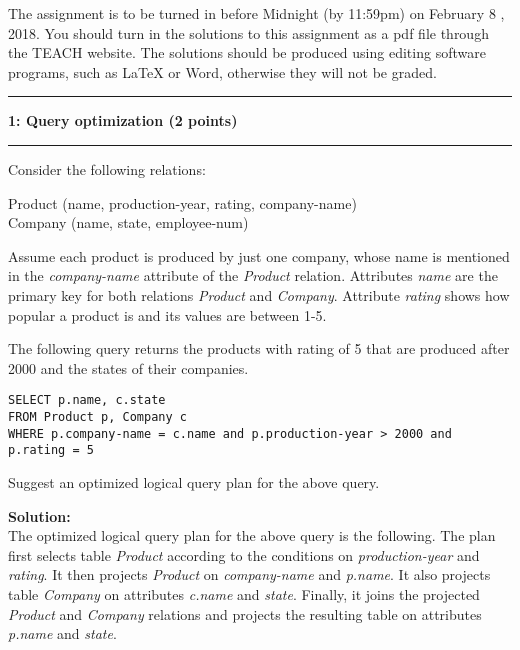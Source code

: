 \documentclass[11pt]{article}
\newcommand\question[2]{\vspace{.25in}\hrule\textbf{#1: #2}\vspace{.5em}\hrule\vspace{.10in}}
\begin{document}
\raggedright
\newcommand\NAME{Nicholas Jake Jeffreys}  %
\newcommand\ANDREWID{932-221-702}     %
\newcommand\HWNUM{4}              %


The assignment is to be turned in before Midnight (by 11:59pm) on February 8 , 2018.
You should turn in the solutions to this assignment as a pdf file through the TEACH website.
The solutions should be produced using editing software programs, such as LaTeX or Word, otherwise they will not be graded.


\question{1}{Query optimization  (2 points)}
Consider the following relations:


Product (name, production-year, rating, company-name)\\
Company (name, state, employee-num)

Assume each product is produced by just one company, whose name is mentioned in the
{\it company-name} attribute of the {\it Product} relation.
Attributes {\it name} are the primary key for both relations {\it Product} and {\it Company}.
Attribute {\it rating} shows how popular a product is and
its values are between 1-5.


The following query returns the products with rating of 5 that are produced after 2000 and the states of their companies.\\

\begin{verbatim}
SELECT p.name, c.state
FROM Product p, Company c
WHERE p.company-name = c.name and p.production-year > 2000 and p.rating = 5
\end{verbatim}

Suggest an optimized logical query plan for the above query. \\
\vspace{3mm}

\textbf{Solution:}\\
The optimized logical query plan for the above query is the following. The plan first selects table \textit{Product} according to the conditions on \textit{production-year} and \textit{rating}. It then projects \textit{Product} on \textit{company-name} and \textit{p.name}. It also projects table \textit{Company} on attributes \textit{c.name} and \textit{state}. Finally, it joins the projected \textit{Product} and \textit{Company} relations and projects the resulting table on attributes \textit{p.name} and \textit{state}.
\end{document}
